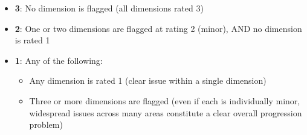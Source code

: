 \begin{tcolorbox}[promptbox, title={\small Conversation Progression Prompt}]
      \begin{itemize}
        \item \textbf{3}: No dimension is flagged (all dimensions rated 3)
        \item \textbf{2}: One or two dimensions are flagged at rating 2 (minor), AND no dimension is rated 1
        \item \textbf{1}: Any of the following:
        \begin{itemize}
          \item Any dimension is rated 1 (clear issue within a single dimension)
          \item Three or more dimensions are flagged (even if each is individually minor, widespread issues across many areas constitute a clear overall progression problem)
        \end{itemize}
      \end{itemize}


\end{tcolorbox}
